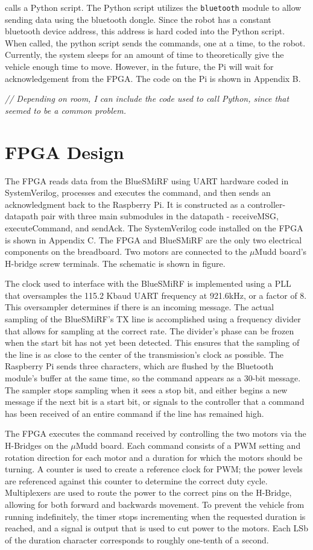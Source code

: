 \documentclass[12pt]{article}
\begin{document}
calls a Python script. The Python script utilizes the \verb.bluetooth. module to allow sending data using the bluetooth dongle. Since the robot has a constant bluetooth device address, this address is hard coded into the Python script. When called, the python script sends the commands, one at a time, to the robot. Currently, the system sleeps for an amount of time to theoretically give the vehicle enough time to move. However, in the future, the Pi will wait for acknowledgement from the FPGA. The code on the Pi is shown in Appendix B. 

{\it // Depending on room, I can include the code used to call Python, since that seemed to be a common problem.}

\section{FPGA Design}

The FPGA reads data from the BlueSMiRF using UART hardware coded in SystemVerilog, processes and executes the command, and then sends an acknowledgment back to the Raspberry Pi.  It is constructed as a controller-datapath pair with three main submodules in the datapath - receiveMSG, executeCommand, and sendAck.  The SystemVerilog code installed on the FPGA is shown in Appendix C. The FPGA and BlueSMiRF are the only two electrical components on the breadboard. Two motors are connected to the $\mu$Mudd board's H-bridge screw terminals.  The schematic is shown in figure.

The clock used to interface with the BlueSMiRF is implemented using a PLL that oversamples the 115.2 Kbaud UART frequency at 921.6kHz, or a factor of 8.  This oversampler determines if there is an incoming message.  The actual sampling of the BlueSMiRF's TX line is accomplished using a frequency divider that allows for sampling at the correct rate.  The divider's phase can be frozen when the start bit has not yet been detected.  This ensures that the sampling of the line is as close to the center of the transmission's clock as possible.  The Raspberry Pi sends three characters, which are flushed by the Bluetooth module's buffer at the same time, so the command appears as a 30-bit message.  The sampler stops sampling when it sees a stop bit, and either begins a new message if the next bit is a start bit, or signals to the controller that a command has been received of an entire command if the line has remained high.

The FPGA executes the command received by controlling the two motors via the H-Bridges on the $\mu$Mudd board. Each command consists of a PWM setting and rotation direction for each motor and a duration for which the motors should be turning.  A counter is used to create a reference clock for PWM; the power levels are referenced against this counter to determine the correct duty cycle.  Multiplexers are used to route the power to the correct pins on the H-Bridge, allowing for both forward and backwards movement.  To prevent the vehicle from running indefinitely, the timer stops incrementing when the requested duration is reached, and a signal is output that is used to cut power to the motors.  Each LSb of the duration character corresponds to roughly one-tenth of a second.
\end{document}
